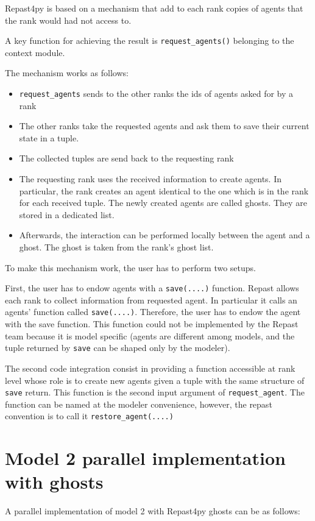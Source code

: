 \documentclass{article}
\providecommand{\tightlist}{%
  \setlength{\itemsep}{0pt}\setlength{\parskip}{0pt}}
\begin{document}
Repast4py is based on a mechanism that add to each rank copies of agents that the rank would had not access to.

A key function for achieving the result is \verb+request_agents()+ belonging to the context module.

The mechanism works as follows:

\begin{itemize}
	\tightlist
	\item 
\verb+request_agents+ sends to the other ranks the ids of agents asked for by a rank
	\item 
The other ranks take the requested agents and ask them to save their current state in a tuple.
	\item 
The collected tuples are send back to the requesting rank
	\item 
		The requesting rank uses the received information to create agents. In particular, the rank creates an agent identical to the one which is in the rank for each received tuple. The newly created agents are called ghosts. They are stored in a dedicated list.
	\item 
		Afterwards, the interaction can be performed locally between the agent and a ghost. The ghost is taken from the rank's ghost list.
\end{itemize}

To make this mechanism work, the user has to perform two setups.

First, the user has to endow agents with a \verb+save(....)+ function.
Repast allows each rank to collect information from requested agent. In particular it calls an agents' function called \verb+save(....)+.
Therefore, the user has to endow the agent with the save function. This function could not be implemented by the Repast team because it is model specific (agents are different among models, and the tuple returned by \verb+save+ can be shaped only by the modeler).

The second code integration consist in providing a function accessible at rank level whose role is to create new agents given a tuple with the same structure of \verb+save+ return. This function is the second input argument of \verb+request_agent+. The function can be named at the modeler convenience, however, the repast convention is to call it \verb+restore_agent(....)+   


\section{Model 2 parallel implementation with ghosts}
A parallel implementation of model 2 with Repast4py ghosts can be as follows:
\end{document}
